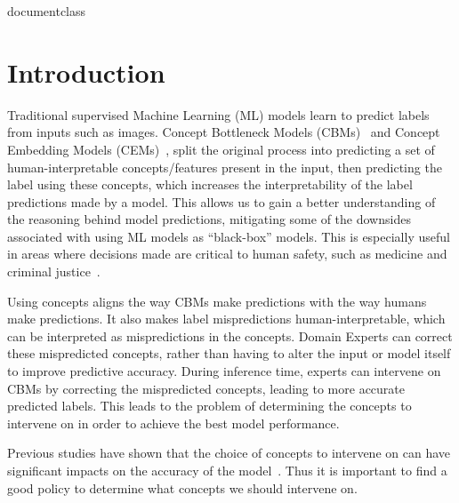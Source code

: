 \csname documentclass

\chapter{Introduction}
\label{firstcontentpage}


Traditional supervised Machine Learning (ML) models learn to 
predict labels from inputs such as images.
Concept Bottleneck Models (CBMs)~\cite{cbm} and Concept Embedding Models (CEMs)~\cite{cem},
split the original process into predicting a set of human-interpretable
concepts/features present in the input, then predicting the label using these concepts,
which increases the interpretability of the label predictions 
made by a model.
This allows us to 
gain a better understanding of the reasoning behind model  
predictions, 
mitigating some of the downsides associated with using ML models as ``black-box'' models.
This is especially useful in areas where 
decisions made are critical to 
human safety, such as medicine
and criminal justice~\cite{xai-1, xai, xai-2}.

Using concepts aligns the way
CBMs make predictions with the way humans make predictions.
It also makes label mispredictions
human-interpretable, which
can be interpreted as mispredictions in
the concepts. Domain Experts can correct these
mispredicted concepts, rather than having to alter the 
input or model itself to improve predictive accuracy.
During inference time, experts can intervene on CBMs by correcting
the mispredicted concepts, leading to more accurate predicted labels. 
This leads to the problem of determining the concepts to intervene on in order
to achieve the best model performance.

Previous studies have shown that the choice of concepts to 
intervene on can have significant impacts on the accuracy of the model~\cite{coop, cbm, ectp}.
Thus it is important to find a good policy to determine what concepts we should intervene on.

